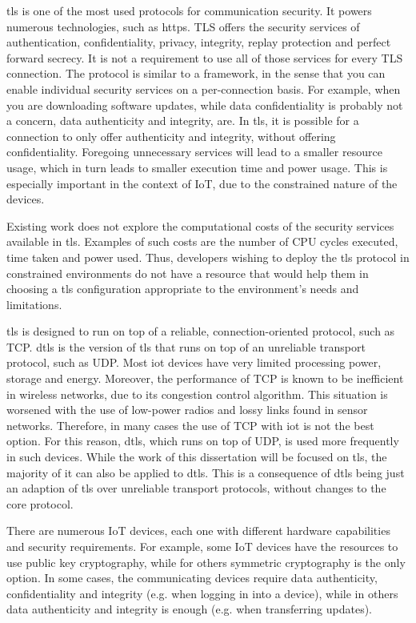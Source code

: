 \gls{tls} is one of the most used protocols for communication security. It
powers numerous technologies, such as \gls{https}. TLS offers the
security services of authentication, confidentiality, privacy, integrity, replay
protection and perfect forward secrecy. It is not a requirement to use all of
those services for every TLS connection. The protocol is similar to
a framework, in the sense that you can enable individual security
services on a per-connection basis. For example, when you are downloading
software updates, while data confidentiality is probably not a concern,
data authenticity and integrity, are. In \gls{tls}, it is possible for a connection
to only offer authenticity and integrity, without offering confidentiality.
Foregoing unnecessary services will lead to a smaller resource usage,
which in turn leads to smaller execution time and power usage. This
is especially important in the context of IoT, due to the constrained
nature of the devices. 

Existing work does not explore the computational costs
of the security services available in \gls{tls}. Examples of such costs are the 
number of CPU cycles executed, time taken and power used.  
Thus, developers wishing to deploy the \gls{tls} protocol
in constrained environments do not have a resource that would help them in choosing a \gls{tls}
configuration appropriate to the environment's needs and limitations.

\gls{tls} is designed to run on top of a reliable, connection-oriented
protocol, such as TCP. \gls{dtls} is the version of \gls{tls} that runs on top
of an unreliable transport protocol, such as UDP. Most \gls{iot} devices have
very limited processing power, storage and energy. Moreover, the performance of
TCP is known to be inefficient in wireless networks, due to its congestion control
algorithm. This situation is worsened with the use of low-power radios and lossy
links found in sensor networks. Therefore, in many cases the use of TCP with \gls{iot}
is not the best option. For this reason, \gls{dtls}, which runs on top
of UDP, is used more frequently in such devices. 
While the work of this dissertation will be focused on \gls{tls}, the majority of it
can also be applied to \gls{dtls}. This is a consequence of \gls{dtls} being 
just an adaption of \gls{tls} over unreliable  transport protocols, 
without changes to the core protocol.

There are numerous IoT devices, each one with different hardware
capabilities and security requirements. For example, some IoT
devices have the resources to use public key cryptography,
while for others symmetric cryptography is the only option.
In some cases, the communicating devices require data authenticity, confidentiality
and integrity (e.g. when logging in into a device), while in others data
authenticity and integrity is enough (e.g. when transferring updates).

